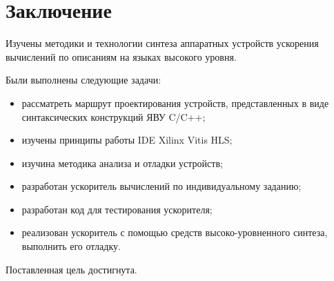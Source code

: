 \chapter*{Заключение}
Изучены методики и технологии синтеза аппаратных устройств ускорения вычислений по описаниям на языках высокого уровня. 

Были выполнены следующие задачи:
\begin{itemize}
	\item рассматреть маршрут проектирования устройств, представленных в виде синтаксических конструкций ЯВУ C/C++;
	\item изучены принципы работы IDE Xilinx Vitis HLS;
	\item изучина методика анализа и отладки устройств;
	\item разработан ускоритель вычислений по индивидуальному заданию;
	\item разработан код для тестирования ускорителя;
	\item реализован ускоритель с помощью средств высоко-уровненного синтеза, выполнить его отладку.
\end{itemize}

Поставленная цель достигнута.